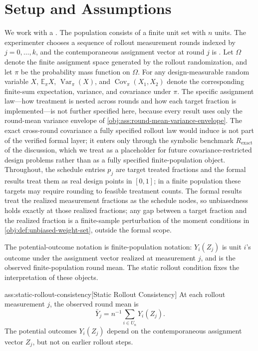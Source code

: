 \section{Setup and Assumptions}

We work with a . The population consists of a finite unit set  with \(n\) units. The experimenter chooses a sequence of rollout measurement rounds indexed by \(j=0,\ldots,k\), and the contemporaneous assignment vector at round \(j\) is . Let \(\Omega\) denote the finite assignment space generated by the rollout randomization, and let \(\pi\) be the probability mass function on \(\Omega\). For any design-measurable random variable \(X\), \(\mathbb E_\pi X\), \(\operatorname{Var}_\pi(X)\), and \(\operatorname{Cov}_\pi(X_1,X_2)\) denote the corresponding finite-sum expectation, variance, and covariance under \(\pi\). The specific assignment law---how treatment is nested across rounds and how each target fraction is implemented---is not further specified here, because every result uses only the round-mean variance envelope of \cref{obj:ass:round-mean-variance-envelope}. The exact cross-round covariance a fully specified rollout law would induce is not part of the verified formal layer; it enters only through the symbolic benchmark \(R_{\mathrm{exact}}\) of the discussion, which we treat as a placeholder for future covariance-restricted design problems rather than as a fully specified finite-population object. Throughout, the schedule entries \(p_j\) are target treated fractions and the formal results treat them as real design points in \([0,1]\); in a finite population these targets may require rounding to feasible treatment counts. The formal results treat the realized measurement fractions as the schedule nodes, so unbiasedness holds exactly at those realized fractions; any gap between a target fraction and the realized fraction is a finite-sample perturbation of the moment conditions in \cref{obj:def:unbiased-weight-set}, outside the formal scope.

The potential-outcome notation is finite-population notation: \(Y_i(Z_j)\) is unit \(i\)'s outcome under the assignment vector realized at measurement \(j\), and  is the observed finite-population round mean. The static rollout condition fixes the interpretation of these objects.

\begin{assumptionv}{ass:static-rollout-consistency}[Static Rollout Consistency]
At each rollout measurement \(j\), the observed round mean is
\[
\bar Y_j
=
n^{-1}\sum_{i\in U_n} Y_i(Z_j).
\]
The potential outcomes \(Y_i(Z_j)\) depend on the contemporaneous assignment vector \(Z_j\), but not on earlier rollout steps.
\end{assumptionv}

